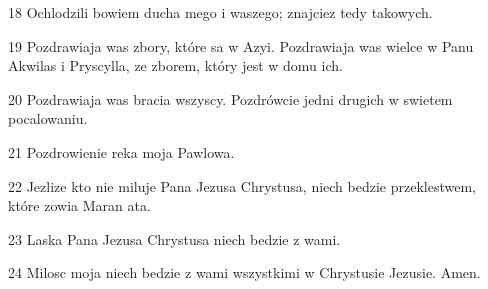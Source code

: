 \par 18 Ochlodzili bowiem ducha mego i waszego; znajciez tedy takowych.
\par 19 Pozdrawiaja was zbory, które sa w Azyi. Pozdrawiaja was wielce w Panu Akwilas i Pryscylla, ze zborem, który jest w domu ich.
\par 20 Pozdrawiaja was bracia wszyscy. Pozdrówcie jedni drugich w swietem pocalowaniu.
\par 21 Pozdrowienie reka moja Pawlowa.
\par 22 Jezlize kto nie miluje Pana Jezusa Chrystusa, niech bedzie przeklestwem, które zowia Maran ata.
\par 23 Laska Pana Jezusa Chrystusa niech bedzie z wami.
\par 24 Milosc moja niech bedzie z wami wszystkimi w Chrystusie Jezusie. Amen.


